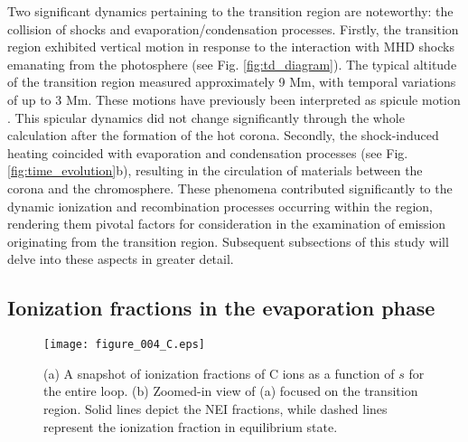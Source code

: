 \documentclass[fleqn,usenatbib]{mnras}
\begin{document}
Two significant dynamics pertaining to the transition region are noteworthy: the collision of shocks and evaporation/condensation processes.
Firstly, the transition region exhibited vertical motion in response to the interaction with MHD shocks emanating from the photosphere (see Fig. \ref{fig:td_diagram}). 
The typical altitude of the transition region measured approximately 9 Mm, with temporal variations of up to 3 Mm. 
These motions have previously been interpreted as spicule motion \citep{1982SoPh...75...35H, 1999ApJ...514..493K}.
This spicular dynamics did not change significantly through the whole calculation after the formation of the hot corona. 
Secondly, the shock-induced heating coincided with evaporation and condensation processes (see Fig. \ref{fig:time_evolution}b), resulting in the circulation of materials between the corona and the chromosphere. 
These phenomena contributed significantly to the dynamic ionization and recombination processes occurring within the region, rendering them pivotal factors for consideration in the examination of emission originating from the transition region. 
Subsequent subsections of this study will delve into these aspects in greater detail.

\subsection{Ionization fractions in the evaporation phase}

\begin{figure}
	\texttt{[image: figure\_004\_C.eps]}
    \caption{(a) A snapshot of ionization fractions of C ions as a function of $s$ for the entire loop.
    (b) Zoomed-in view of (a) focused on the transition region.
    Solid lines depict the NEI fractions, while dashed lines represent the ionization fraction in equilibrium state.
    }
    \label{fig:ion_frac_s}
\end{figure}
\end{document}
